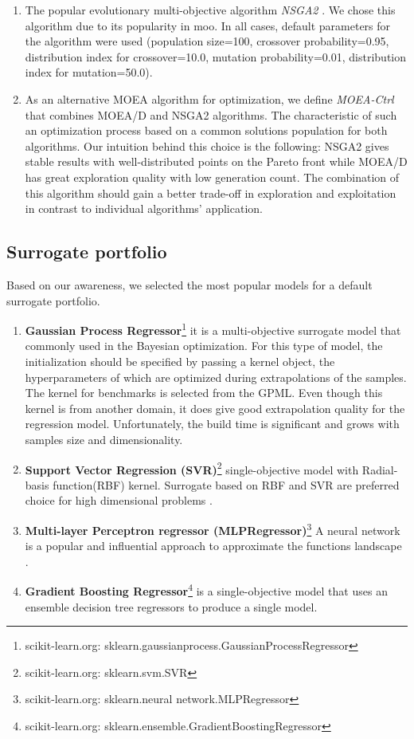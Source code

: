     \begin{enumerate}
        \item The popular evolutionary multi-objective algorithm \emph{NSGA2} \cite{DebAPM00}. We chose this algorithm due to its popularity in \gls{moo}. In all cases, default parameters for the algorithm were used (population size=100, crossover probability=0.95, distribution index for crossover=10.0, mutation probability=0.01, distribution index for mutation=50.0)\cite{francesco_biscani_2019}.
        \item As an alternative MOEA algorithm for optimization, we define \emph{MOEA-Ctrl} that combines MOEA/D \cite{ZhangL07} and NSGA2 algorithms. The characteristic of such an optimization process based on a common solutions population for both algorithms. Our intuition behind this choice is the following: NSGA2 gives stable results with well-distributed points on the Pareto front while MOEA/D has great exploration quality with low generation count. The combination of this algorithm should gain a better trade-off in exploration and exploitation in contrast to individual algorithms' application.  
    \end{enumerate}

    \subsection{Surrogate portfolio}
    Based on our awareness, we selected the most popular models for a default surrogate portfolio.
    \begin{enumerate}
        \item \textbf{Gaussian Process Regressor}\footnote{{scikit-learn.org}: sklearn.gaussianprocess.GaussianProcessRegressor} it is a multi-objective surrogate model that commonly used in the Bayesian optimization. For this type of model, the initialization should be specified by passing a kernel object, the hyperparameters of which are optimized during extrapolations of the samples.  The kernel for benchmarks is selected from the GPML\cite{RasmussenN10}. Even though this kernel is from another domain, it does give good extrapolation quality for the regression model. Unfortunately, the build time is significant and grows with samples size and dimensionality.
        \item \textbf{Support Vector Regression (SVR)}\footnote{{scikit-learn.org}: sklearn.svm.SVR} single-objective model with Radial-basis function(RBF) kernel. Surrogate based on RBF and SVR are preferred choice for high dimensional problems \cite{akhtar2019efficient}.
        \item \textbf{Multi-layer Perceptron regressor (MLPRegressor)}\footnote{{scikit-learn.org}: sklearn.neural network.MLPRegressor} A neural network is a popular and influential approach to approximate the functions landscape \cite{KOURAKOS201313}.
        \item \textbf{Gradient Boosting Regressor}\footnote{{scikit-learn.org}: sklearn.ensemble.GradientBoostingRegressor} is a single-objective model that uses an ensemble decision tree regressors to produce a single model.
    \end{enumerate}
    
